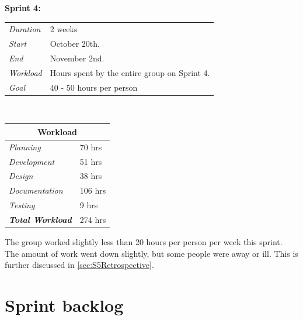 \begin{minipage}{\linewidth}
\centering
\setlength{\tabcolsep}{22pt}
\textbf{Sprint 4:} 
\smallskip
{}
\begin{tabular}{ |l l| }
	\hline
	\it{Duration} & 2 weeks \\
	\it{Start} & October 20th. \\
	\it{End} & November 2nd. \\
	\it{Workload} & Hours spent by the entire group on Sprint 4. \\
	\it{Goal} & 40 - 50 hours per person \\
	\hline
\end{tabular}
\end{minipage}\\%
%
\begin{minipage}{\linewidth}
\setlength{\tabcolsep}{15pt}
\centering
{}
\begin{tabular}{ |l|l| }
	\hline
	\multicolumn{2}{|c|}{\cellcolor{gray!25} Workload} \\
	\hline
	\it{Planning} & 70 hrs\\
	\it{Development} & 51 hrs\\
	\it{Design} & 38 hrs\\
	\it{Documentation} & 106 hrs\\
	\it{Testing} & 9 hrs\\
	\hline
	\textbf{\textit{Total Workload}} & 274 hrs\\
	\hline
\end{tabular}
\end{minipage}

The group worked slightly less than 20 hours per person per week this sprint. The amount of work went down slightly, but some people were away or ill. This is further discussed in \ref{sec:S5Retrospective}.

\section{Sprint backlog}
\label{sec:S5Backlog}

